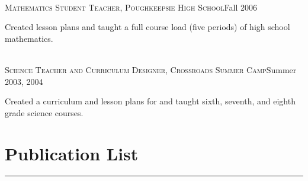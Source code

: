 \documentclass[10pt]{cv}
\begin{document}
\begin{llist}
\begin{minipage}[l]{0.7\textwidth}
\end{minipage}\vspace{0.15cm}
\\
\textsc{Mathematics Student Teacher, Poughkeepsie High School}\hfill Fall 2006\\
\begin{minipage}[l]{0.7\textwidth}\vspace{0.15cm}
Created lesson plans and taught a full course load (five periods) of high school mathematics.\\
\end{minipage}\vspace{0.15cm}
\\
\textsc{Science Teacher and Curriculum Designer, Crossroads Summer Camp}\hfill Summer 2003, 2004 \\
\begin{minipage}[l]{0.7\textwidth}\vspace{0.15cm}
Created a curriculum and lesson plans for and taught sixth, seventh, and eighth grade science courses.
\end{minipage}\vspace{0.15cm}
\end{llist}
\newpage
\section{{\LARGE \bf{Publication List}}}
{\rule{\linewidth}{0.5mm}} \\
\begin{llist}


%
\end{llist}
\end{document}
